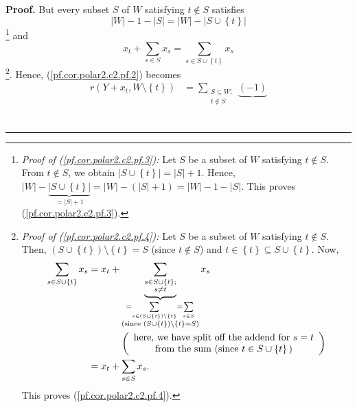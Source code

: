 \documentclass[numbers=enddot,12pt,final,onecolumn,notitlepage]{scrartcl}%
\theoremstyle{definition}
\newenvironment{proof}[1][Proof]{\noindent\textbf{#1.} }{\ \rule{0.5em}{0.5em}}
\let\sumnonlimits\sum
\renewcommand{\sum}{\sumnonlimits\limits}
\newenvironment{verlong}{}{}
\begin{document}
\begin{proof}
\begin{verlong}
But every subset $S$ of $W$ satisfying $t\notin S$ satisfies%
\begin{equation}
\left\vert W\right\vert -1-\left\vert S\right\vert =\left\vert W\right\vert
-\left\vert S\cup\left\{  t\right\}  \right\vert \label{pf.cor.polar2.c2.pf.3}%
\end{equation}
\footnote{\textit{Proof of (\ref{pf.cor.polar2.c2.pf.3}):} Let $S$ be a subset
of $W$ satisfying $t\notin S$. From $t\notin S$, we obtain $\left\vert
S\cup\left\{  t\right\}  \right\vert =\left\vert S\right\vert +1$. Hence,
$\left\vert W\right\vert -\underbrace{\left\vert S\cup\left\{  t\right\}
\right\vert }_{=\left\vert S\right\vert +1}=\left\vert W\right\vert -\left(
\left\vert S\right\vert +1\right)  =\left\vert W\right\vert -1-\left\vert
S\right\vert $. This proves (\ref{pf.cor.polar2.c2.pf.3}).} and
\begin{equation}
x_{t}+\sum_{s\in S}x_{s}=\sum_{s\in S\cup\left\{  t\right\}  }x_{s}
\label{pf.cor.polar2.c2.pf.4}%
\end{equation}
\footnote{\textit{Proof of (\ref{pf.cor.polar2.c2.pf.4}):} Let $S$ be a subset
of $W$ satisfying $t\notin S$. Then, $\left(  S\cup\left\{  t\right\}
\right)  \setminus\left\{  t\right\}  =S$ (since $t\notin S$) and
$t\in\left\{  t\right\}  \subseteq S\cup\left\{  t\right\}  $. Now,
\begin{align*}
\sum_{s\in S\cup\left\{  t\right\}  }x_{s}  &  =x_{t}+\underbrace{\sum
_{\substack{s\in S\cup\left\{  t\right\}  ;\\s\neq t}}}_{\substack{=\sum
_{s\in\left(  S\cup\left\{  t\right\}  \right)  \setminus\left\{  t\right\}
}=\sum_{s\in S}\\\text{(since }\left(  S\cup\left\{  t\right\}  \right)
\setminus\left\{  t\right\}  =S\text{)}}}x_{s}\\
&  \ \ \ \ \ \ \ \ \ \ \left(
\begin{array}
[c]{c}%
\text{here, we have split off the addend for }s=t\\
\text{from the sum (since }t\in S\cup\left\{  t\right\}  \text{)}%
\end{array}
\right) \\
&  =x_{t}+\sum_{s\in S}x_{s}.
\end{align*}
This proves (\ref{pf.cor.polar2.c2.pf.4}).}. Hence,
(\ref{pf.cor.polar2.c2.pf.2}) becomes%
\begin{align}
r\left(  Y+x_{t},W\setminus\left\{  t\right\}  \right)   &  =\sum
_{\substack{S\subseteq W;\\t\notin S}}\underbrace{\left(  -1\right)
}
\end{align}
\end{verlong}
\end{proof}
\end{document}
